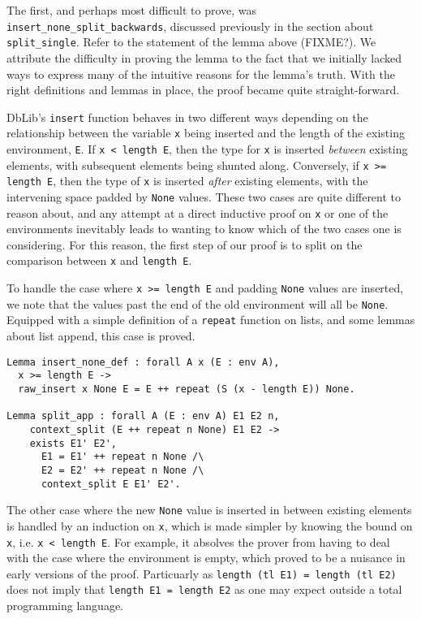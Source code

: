 \documentclass[]{unswthesis}
\let\c\texttt
\let\i\textit
\begin{document}
The first, and perhaps most difficult to prove, was \c{insert_none_split_backwards}, discussed previously in the section about \c{split_single}. Refer to the statement of the lemma above (FIXME?). We attribute the difficulty in proving the lemma to the fact that we initially lacked ways to express many of the intuitive reasons for the lemma's truth. With the right definitions and lemmas in place, the proof became quite straight-forward.

DbLib's \c{insert} function behaves in two different ways depending on the relationship between the variable \c{x} being inserted and the length of the existing environment, \c{E}. If \c{x < length E}, then the type for \c{x} is inserted \i{between} existing elements, with subsequent elements being shunted along. Conversely, if \c{x >= length E}, then the type of \c{x} is inserted \i{after} existing elements, with the intervening space padded by \c{None} values. These two cases are quite different to reason about, and any attempt at a direct inductive proof on \c{x} or one of the environments inevitably leads to wanting to know which of the two cases one is considering. For this reason, the first step of our proof is to split on the comparison between \c{x} and \c{length E}.

To handle the case where \c{x >= length E} and padding \c{None} values are inserted, we note that the values past the end of the old environment will all be \c{None}. Equipped with a simple definition of a \c{repeat} function on lists, and some lemmas about list append, this case is proved.

\begin{verbatim}
Lemma insert_none_def : forall A x (E : env A),
  x >= length E ->
  raw_insert x None E = E ++ repeat (S (x - length E)) None.

Lemma split_app : forall A (E : env A) E1 E2 n,
    context_split (E ++ repeat n None) E1 E2 ->
    exists E1' E2',
      E1 = E1' ++ repeat n None /\
      E2 = E2' ++ repeat n None /\
      context_split E E1' E2'.
\end{verbatim} 

The other case where the new \c{None} value is inserted in between existing elements is handled by an induction on \c{x}, which is made simpler by knowing the bound on \c{x}, i.e. \c{x < length E}. For example, it absolves the prover from having to deal with the case where the environment is empty, which proved to be a nuisance in early versions of the proof. Particuarly as \c{length (tl E1) = length (tl E2)} does not imply that \c{length E1 = length E2} as one may expect outside a total programming language.
\end{document}
